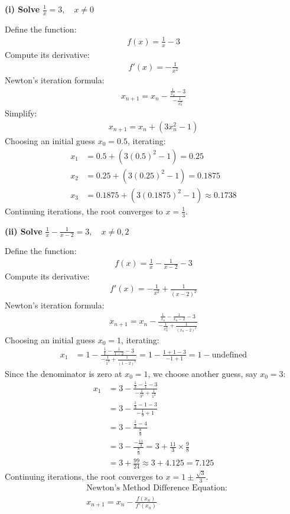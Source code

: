 \documentclass[journal]{IEEEtran}
\begin{document}
\textbf{(i) Solve } $\frac{1}{x} = 3, \quad x \neq 0$

Define the function:
\begin{align}
    f(x) = \frac{1}{x} - 3
\end{align}
Compute its derivative:
\begin{align}
    f'(x) = -\frac{1}{x^2}
\end{align}
Newton's iteration formula:
\begin{align}
    x_{n+1} = x_n - \frac{\frac{1}{x_n} - 3}{-\frac{1}{x_n^2}}
\end{align}
Simplify:
\begin{align}
    x_{n+1} = x_n + (3x_n^2 - 1)
\end{align}
Choosing an initial guess $x_0 = 0.5$, iterating:
\begin{align}
    x_1 &= 0.5 + (3(0.5)^2 - 1) = 0.25 \\
    x_2 &= 0.25 + (3(0.25)^2 - 1) = 0.1875 \\
    x_3 &= 0.1875 + (3(0.1875)^2 - 1) \approx 0.1738
\end{align}
Continuing iterations, the root converges to $x = \frac{1}{3}$.

\textbf{(ii) Solve } $\frac{1}{x} - \frac{1}{x-2} = 3, \quad x \neq 0,2$

Define the function:
\begin{align}
    f(x) = \frac{1}{x} - \frac{1}{x-2} - 3
\end{align}
Compute its derivative:
\begin{align}
    f'(x) = -\frac{1}{x^2} + \frac{1}{(x-2)^2}
\end{align}
Newton's iteration formula:
\begin{align}
    x_{n+1} = x_n - \frac{\frac{1}{x_n} - \frac{1}{x_n-2} - 3}{-\frac{1}{x_n^2} + \frac{1}{(x_n-2)^2}}
\end{align}
Choosing an initial guess $x_0 = 1$, iterating:
\begin{align}
    x_1 &= 1 - \frac{\frac{1}{1} - \frac{1}{1-2} - 3}{-\frac{1}{1^2} + \frac{1}{(1-2)^2}} = 1 - \frac{1 + 1 - 3}{-1 + 1} = 1 - \text{undefined}
\end{align}
Since the denominator is zero at $x_0 = 1$, we choose another guess, say $x_0 = 3$:
\begin{align}
    x_1 &= 3 - \frac{\frac{1}{3} - \frac{1}{1} - 3}{-\frac{1}{3^2} + \frac{1}{1^2}} \\
    &= 3 - \frac{\frac{1}{3} - 1 - 3}{-\frac{1}{9} + 1} \\
    &= 3 - \frac{\frac{1}{3} - 4}{\frac{8}{9}} \\
    &= 3 - \frac{-\frac{11}{3}}{\frac{8}{9}} = 3 + \frac{11}{3} \times \frac{9}{8} \\
    &= 3 + \frac{99}{24} \approx 3 + 4.125 = 7.125
\end{align}
Continuing iterations, the root converges to $x = 1 \pm \frac{\sqrt{3}}{3}$.
\begin{align}
    &\text{Newton's Method Difference Equation:} \nonumber \\[2ex]
    &x_{n+1} = x_n - \frac{f(x_n)}{f'(x_n)} \label{eq:newton_general}
\end{align}
\end{document}
